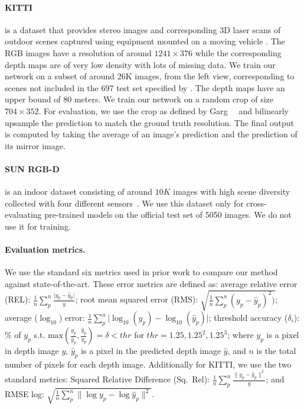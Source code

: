 \documentclass[final]{cvpr}
\begin{document}
\paragraph{KITTI} is a dataset that provides stereo images and corresponding 3D laser scans of outdoor scenes captured using equipment mounted on a moving vehicle \cite{geiger2013vision}. The RGB images have a resolution of around $1241\times376$ while the corresponding depth maps are of very low density with lots of missing data. We train our network on a subset of around 26K images, from the left view, corresponding to scenes not included in the 697 test set specified by \cite{Eigen2014}. The depth maps have an upper bound of 80 meters. We train our network on a random crop of size $704\times352$. For evaluation, we use the crop as defined by Garg~\etal~\cite{garg10.1007/978-3-319-46484-8_45} and bilinearly upsample the prediction to match the ground truth resolution. The final output is computed by taking the average of an image's prediction and the prediction of its mirror image.

\paragraph{SUN RGB-D} is an indoor dataset consisting of around $10K$ images with high scene diversity collected with four different sensors~\cite{Song2015_sunrgbd,sun6751312,janoch2013category}. We use this dataset only for cross-evaluating pre-trained models on the official test set of 5050 images. We do not use it for training.

\paragraph{Evaluation metrics.} We use the standard six metrics used in prior work \cite{Eigen2014} to compare our method against state-of-the-art. These error metrics are defined as:
%
average relative error (REL): $\frac{1}{n}\sum_p^n \frac{\lvert y_p-\hat{y}_p \rvert}{y}$;
root mean squared error (RMS): $\sqrt{\frac{1}{n}\sum_p^n (y_p-\hat{y}_p)^2)}$;
average ($\log_{10}$) error: $\frac{1}{n}\sum_p^n \lvert \log_{10}(y_p)-\log_{10}(\hat{y}_p) \rvert$;
threshold accuracy ($\delta_i$): $\%$ of $y_p$ s.t. $\text{max}(\frac{y_p}{\hat{y}_p},\frac{\hat{y}_p}{y_p}) = \delta < thr$ for $thr=1.25,1.25^2,1.25^3$;
%
where $y_p$ is a pixel in depth image $y$, $\hat{y}_p$ is a pixel in the predicted depth image $\hat{y}$, and $n$ is the total number of pixels for each depth image. 
%
Additionally for KITTI, we use the two standard metrics: Squared Relative Difference (Sq.~Rel): $\frac{1}{n}\sum_p^n \frac{\|y_p-\hat{y}_p \|^2}{y}$; 
and RMSE log: $\sqrt{\frac{1}{n}\sum_p^n \|\log y_p - \log \hat{y}_p\|^2}$.
\end{document}
